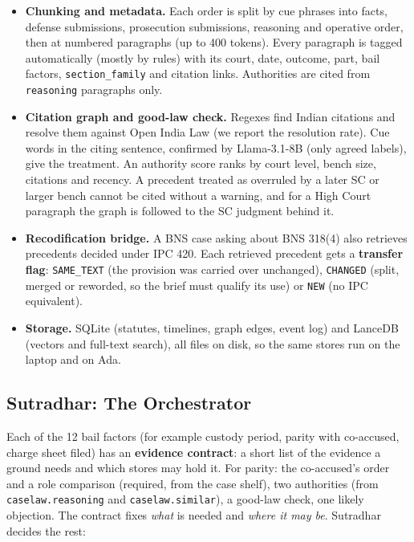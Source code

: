\documentclass[10pt,a4paper]{article}
\newcommand{\st}[1]{\texttt{\small #1}}
\begin{document}
\begin{itemize}
\item \textbf{Chunking and metadata.} Each order is split by cue phrases into facts, defense submissions, prosecution submissions, reasoning and operative order, then at numbered paragraphs (up to 400 tokens). Every paragraph is tagged automatically (mostly by rules) with its court, date, outcome, part, bail factors, \st{section\_\allowbreak{}family} and citation links. Authorities are cited from \st{reasoning} paragraphs only.
\item \textbf{Citation graph and good-law check.} Regexes find Indian citations and resolve them against Open India Law (we report the resolution rate). Cue words in the citing sentence, confirmed by Llama-3.1-8B (only agreed labels), give the treatment. An authority score ranks by court level, bench size, citations and recency. A precedent treated as overruled by a later SC or larger bench cannot be cited without a warning, and for a High Court paragraph the graph is followed to the SC judgment behind it.
\item \textbf{Recodification bridge.} A BNS case asking about BNS 318(4) also retrieves precedents decided under IPC 420. Each retrieved precedent gets a \textbf{transfer flag}: \st{SAME\_\allowbreak{}TEXT} (the provision was carried over unchanged), \st{CHANGED} (split, merged or reworded, so the brief must qualify its use) or \st{NEW} (no IPC equivalent).
\item \textbf{Storage.} SQLite (statutes, timelines, graph edges, event log) and LanceDB (vectors and full-text search), all files on disk, so the same stores run on the laptop and on Ada.
\end{itemize}

\subsection{Sutradhar: The Orchestrator}

Each of the 12 bail factors (for example custody period, parity with co-accused, charge sheet filed) has an \textbf{evidence contract}: a short list of the evidence a ground needs and which stores may hold it. For parity: the co-accused's order and a role comparison (required, from the case shelf), two authorities (from \st{caselaw.reasoning} and \st{caselaw.similar}), a good-law check, one likely objection. The contract fixes \emph{what} is needed and \emph{where it may be}. Sutradhar decides the rest:
\end{document}
